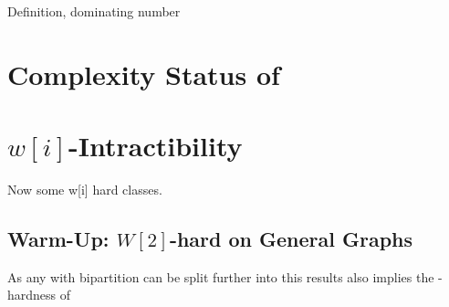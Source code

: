 Definition, dominating number

\section{Complexity Status of \sdom}\label{ch:complexity-status}


\section{\hmath $w[i]$-Intractibility}

Now some w[i] hard classes. 

\subsection{Warm-Up: \hmath $W[2]$-hard on General Graphs}


As any \bg with bipartition can be split further into \rpg this results also implies the \wone-hardness of \rpg

